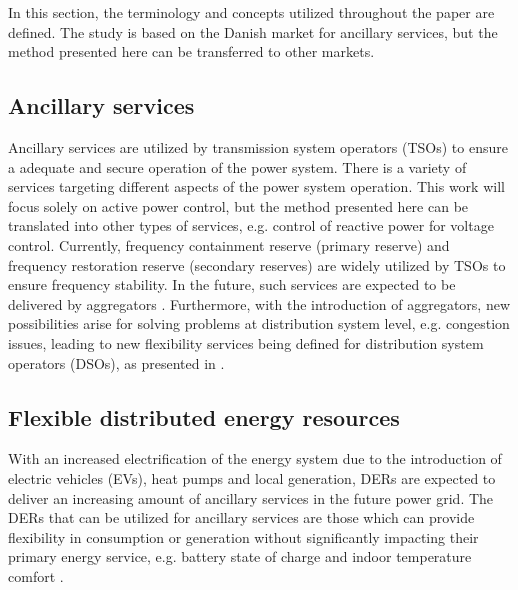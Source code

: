 In this section, the terminology and concepts utilized throughout the paper are defined. The study is based on the Danish market for ancillary services, but the method presented here can be transferred to other markets.  

\subsection{Ancillary services}
Ancillary services are utilized by transmission system operators (TSOs) to ensure a adequate and secure operation of the power system. There is a variety of services targeting different aspects of the power system operation. This work will focus solely on active power control, but the method presented here can be translated into other types of services, e.g. control of reactive power for voltage control. Currently, frequency containment reserve (primary reserve) and frequency restoration reserve (secondary reserves) \cite{entso1operational} are widely utilized by TSOs to ensure frequency stability. In the future, such services are expected to be delivered by aggregators \cite{pudjianto2007virtual,vrettos2015integrating}. Furthermore, with the introduction of aggregators, new possibilities arise for solving problems at distribution system level, e.g. congestion issues, leading to new flexibility services being defined for distribution system operators (DSOs), as presented in \cite{ipower2013development}. %

\subsection{Flexible distributed energy resources}\label{sec:DERs}
With an increased electrification of the energy system due to the introduction of electric vehicles (EVs), heat pumps and local generation, DERs are expected to deliver an increasing amount of ancillary services in the future power grid. The DERs that can be utilized for ancillary services are those which can provide flexibility in consumption or generation without significantly impacting their primary energy service, e.g. battery state of charge and indoor temperature comfort \cite{costanzo2013coordination,halvgaard2012economic}.

